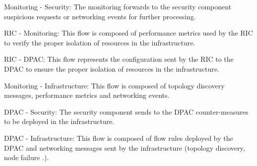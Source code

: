  Monitoring - Security: The monitoring forwards to the security component suspicious requests or networking events for further processing.

 RIC - Monitoring: This flow is composed of performance metrics used by the RIC to verify the proper isolation of resources in the infrastructure.

 RIC - DPAC: This flow represents the configuration sent by the RIC to the DPAC to ensure the proper isolation of resources in the infrastructure.

 Monitoring - Infrastructure: This flow is composed of topology discovery messages, performance metrics and networking events.

 DPAC - Security: The security component sends to the DPAC counter-measures to be deployed in the infrastructure.

 DPAC - Infrastructure: This flow is composed of flow rules deployed by the DPAC and networking messages sent by the infrastructure (\eg topology discovery, node failure \etc.).


